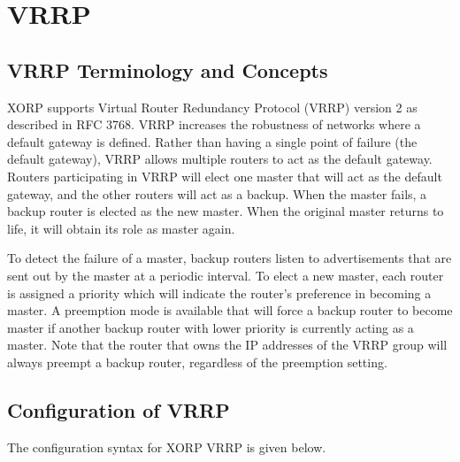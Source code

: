 
\chapter{\label{vrrp}VRRP}

\section{VRRP Terminology and Concepts}
XORP supports Virtual Router Redundancy Protocol (VRRP) version 2 as described
in RFC 3768.  VRRP increases the robustness of networks where a default gateway
is defined.  Rather than having a single point of failure (the default gateway),
VRRP allows multiple routers to act as the default gateway.  Routers
participating in VRRP will elect one master that will act as the default
gateway, and the other routers will act as a backup.  When the master fails, a
backup router is elected as the new master.  When the original master returns to
life, it will obtain its role as master again.  

To detect the failure of a master, backup routers listen to advertisements that
are sent out by the master at a periodic interval.  To elect a new master, each
router is assigned a priority which will indicate the router's preference in
becoming a master.  A preemption mode is available that will force a backup
router to become master if another backup router with lower priority is
currently acting as a master.  Note that the router that owns the IP addresses
of the VRRP group will always preempt a backup router, regardless of the
preemption setting.

\section{Configuration of VRRP}
The configuration syntax for XORP VRRP is given below.

